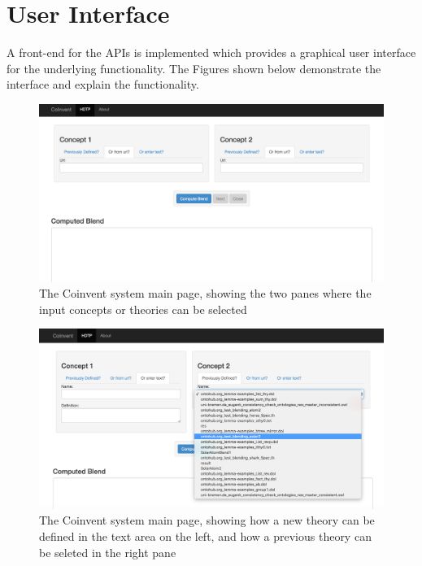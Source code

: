 \section{User Interface}

A front-end for the APIs is implemented which provides a graphical user interface for the underlying functionality. The Figures shown below demonstrate the interface and explain the functionality.

\begin{figure}[!h]
\label{fig:ss1}
\begin{center}
\includegraphics[width=\textwidth]{ss1.png}
\end{center}
\caption{The Coinvent system main page, showing the two panes where the input concepts or theories can be selected}
\end{figure}

\begin{figure}[!h]
\label{fig:ss2}
\begin{center}
\includegraphics[width=\textwidth]{ss2.png}
\end{center}
\caption{The Coinvent system main page, showing how a new theory can be defined in the text area on the left, and how a previous theory can be seleted in the right pane}
\end{figure}

